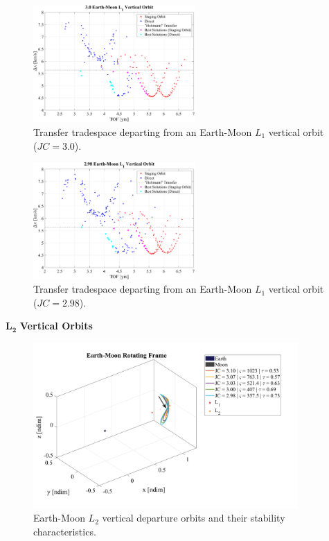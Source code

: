 \begin{figure}[ht]
    \centering
    \includegraphics[width=0.55\textwidth]{figures/TradeSpace_L1Vertical_3_00.pdf}
    \caption{Transfer tradespace departing from an Earth-Moon $L_{1}$ vertical orbit ($JC=3.0$).}
\end{figure}
\clearpage

\begin{figure}[ht]
    \centering
    \includegraphics[width=0.55\textwidth]{figures/TradeSpace_L1Vertical_2_98.pdf}
    \caption{Transfer tradespace departing from an Earth-Moon $L_{1}$ vertical orbit ($JC=2.98$).}
\end{figure}
\clearpage

$\pmb{L_{2}}$ \textbf{Vertical Orbits}
\begin{figure}[ht]
    \centering
    \includegraphics[width=0.9\textwidth]{figures/L2VerticalDepartureOrbits.pdf}
    \caption{Earth-Moon $L_{2}$ vertical departure orbits and their stability characteristics.}
\end{figure}
\clearpage

